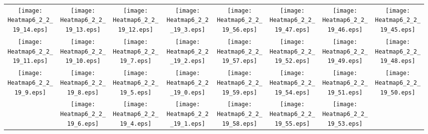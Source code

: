 \documentclass{standalone}
\begin{document}
\begin{tabular}{ *8{c} }
\texttt{[image: Heatmap6\_2\_2\_19\_14.eps]} & \texttt{[image: Heatmap6\_2\_2\_19\_13.eps]} & \texttt{[image: Heatmap6\_2\_2\_19\_12.eps]} & \texttt{[image: Heatmap6\_2\_2\_19\_3.eps]} & \texttt{[image: Heatmap6\_2\_2\_19\_56.eps]} & \texttt{[image: Heatmap6\_2\_2\_19\_47.eps]} & \texttt{[image: Heatmap6\_2\_2\_19\_46.eps]} & \texttt{[image: Heatmap6\_2\_2\_19\_45.eps]} \\
\texttt{[image: Heatmap6\_2\_2\_19\_11.eps]} & \texttt{[image: Heatmap6\_2\_2\_19\_10.eps]} & \texttt{[image: Heatmap6\_2\_2\_19\_7.eps]} & \texttt{[image: Heatmap6\_2\_2\_19\_2.eps]} & \texttt{[image: Heatmap6\_2\_2\_19\_57.eps]} & \texttt{[image: Heatmap6\_2\_2\_19\_52.eps]} & \texttt{[image: Heatmap6\_2\_2\_19\_49.eps]} & \texttt{[image: Heatmap6\_2\_2\_19\_48.eps]} \\
\texttt{[image: Heatmap6\_2\_2\_19\_9.eps]} & \texttt{[image: Heatmap6\_2\_2\_19\_8.eps]} & \texttt{[image: Heatmap6\_2\_2\_19\_5.eps]} & \texttt{[image: Heatmap6\_2\_2\_19\_0.eps]} & \texttt{[image: Heatmap6\_2\_2\_19\_59.eps]} & \texttt{[image: Heatmap6\_2\_2\_19\_54.eps]} & \texttt{[image: Heatmap6\_2\_2\_19\_51.eps]} & \texttt{[image: Heatmap6\_2\_2\_19\_50.eps]} \\
 & \texttt{[image: Heatmap6\_2\_2\_19\_6.eps]} & \texttt{[image: Heatmap6\_2\_2\_19\_4.eps]} & \texttt{[image: Heatmap6\_2\_2\_19\_1.eps]} & \texttt{[image: Heatmap6\_2\_2\_19\_58.eps]} & \texttt{[image: Heatmap6\_2\_2\_19\_55.eps]} & \texttt{[image: Heatmap6\_2\_2\_19\_53.eps]} &  
\end{tabular}
\end{document}
